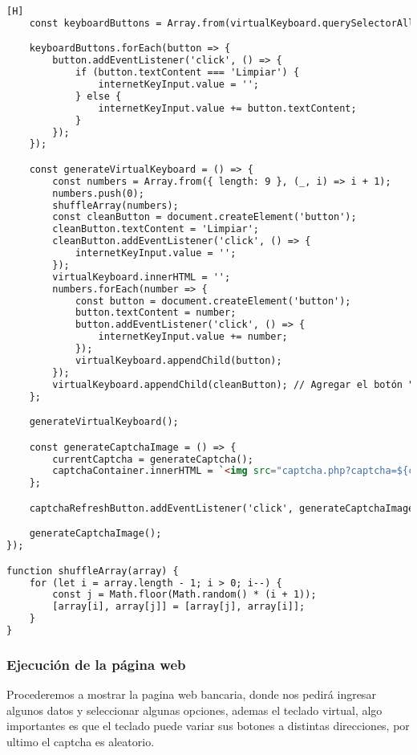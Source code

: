 \documentclass[14pt]{article}
\begin{document}
\begin{lstlisting}[language=html,caption={Code Javasript}][H]
    const keyboardButtons = Array.from(virtualKeyboard.querySelectorAll('button'));

    keyboardButtons.forEach(button => {
        button.addEventListener('click', () => {
            if (button.textContent === 'Limpiar') {
                internetKeyInput.value = '';
            } else {
                internetKeyInput.value += button.textContent;
            }
        });
    });

    const generateVirtualKeyboard = () => {
        const numbers = Array.from({ length: 9 }, (_, i) => i + 1);
        numbers.push(0);
        shuffleArray(numbers);
        const cleanButton = document.createElement('button');
        cleanButton.textContent = 'Limpiar';
        cleanButton.addEventListener('click', () => {
            internetKeyInput.value = '';
        });
        virtualKeyboard.innerHTML = '';
        numbers.forEach(number => {
            const button = document.createElement('button');
            button.textContent = number;
            button.addEventListener('click', () => {
                internetKeyInput.value += number;
            });
            virtualKeyboard.appendChild(button);
        });
        virtualKeyboard.appendChild(cleanButton); // Agregar el botón "Limpiar" al final
    };

    generateVirtualKeyboard();

    const generateCaptchaImage = () => {
        currentCaptcha = generateCaptcha();
        captchaContainer.innerHTML = `<img src="captcha.php?captcha=${currentCaptcha}" alt="Captcha">${currentCaptcha}`;
    };

    captchaRefreshButton.addEventListener('click', generateCaptchaImage);

    generateCaptchaImage();
});

function shuffleArray(array) {
    for (let i = array.length - 1; i > 0; i--) {
        const j = Math.floor(Math.random() * (i + 1));
        [array[i], array[j]] = [array[j], array[i]];
    }
}

    \end{lstlisting}
    \subsubsection{Ejecución de la página web}
    Procederemos a mostrar la pagina web bancaria, donde nos pedirá ingresar algunos datos y seleccionar algunas opciones, ademas el teclado virtual, algo importantes es que el teclado puede variar sus botones a distintas direcciones, por ultimo el captcha es aleatorio.
\end{document}
